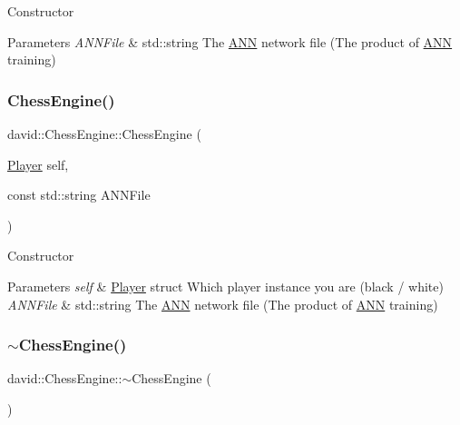 Constructor


\begin{DoxyParams}{Parameters}
{\em A\+N\+N\+File} & std\+::string The \hyperlink{classdavid_1_1ANN}{A\+NN} network file (The product of \hyperlink{classdavid_1_1ANN}{A\+NN} training) \\
\hline
\end{DoxyParams}
\mbox{\label{classdavid_1_1ChessEngine_a17a031eb5b738d0d030addc399eee1be}} 
\subsubsection{\texorpdfstring{Chess\+Engine()}{ChessEngine()}\hspace{0.1cm}{\footnotesize\ttfamily [4/4]}}
{\footnotesize\ttfamily david\+::\+Chess\+Engine\+::\+Chess\+Engine (\begin{DoxyParamCaption}\item[{\hyperlink{structdavid_1_1Player}{Player}}]{self,  }\item[{const std\+::string}]{A\+N\+N\+File }\end{DoxyParamCaption})}

Constructor


\begin{DoxyParams}{Parameters}
{\em self} & \hyperlink{structdavid_1_1Player}{Player} struct Which player instance you are (black / white) \\
\hline
{\em A\+N\+N\+File} & std\+::string The \hyperlink{classdavid_1_1ANN}{A\+NN} network file (The product of \hyperlink{classdavid_1_1ANN}{A\+NN} training) \\
\hline
\end{DoxyParams}
\mbox{\label{classdavid_1_1ChessEngine_a48df80ac4ae29baa7f8bfd50429d4711}} 
\subsubsection{\texorpdfstring{$\sim$\+Chess\+Engine()}{~ChessEngine()}}
{\footnotesize\ttfamily david\+::\+Chess\+Engine\+::$\sim$\+Chess\+Engine (\begin{DoxyParamCaption}{ }\end{DoxyParamCaption})}

